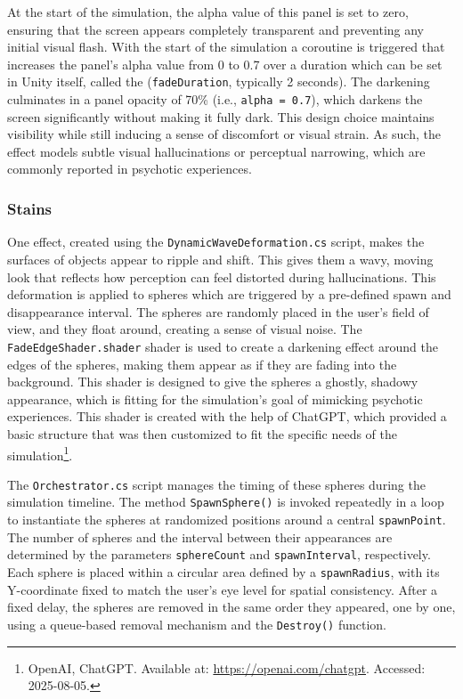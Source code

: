 At the start of the simulation, the alpha value of this panel is set to zero, ensuring that the screen appears completely transparent and preventing any initial visual flash. With the start of the simulation a coroutine is triggered that increases the panel’s alpha value from 0 to 0.7 over a duration which can be set in Unity itself, called the (\texttt{fadeDuration}, typically 2 seconds). The darkening culminates in a panel opacity of 70\% (i.e., \texttt{alpha = 0.7}), which darkens the screen significantly without making it fully dark. This design choice maintains visibility while still inducing a sense of discomfort or visual strain. As such, the effect models subtle visual hallucinations or perceptual narrowing, which are commonly reported in psychotic experiences. 

\subsubsection{Stains}
One effect, created using the \texttt{DynamicWaveDeformation.cs} script, makes the surfaces of objects appear to ripple and shift. This gives them a wavy, moving look that reflects how perception can feel distorted during hallucinations. This deformation is applied to spheres which are triggered by a pre-defined spawn and disappearance interval. The spheres are randomly placed in the user's field of view, and they float around, creating a sense of visual noise. The \texttt{FadeEdgeShader.shader} shader is used to create a darkening effect around the edges of the spheres, making them appear as if they are fading into the background. This shader is designed to give the spheres a ghostly, shadowy appearance, which is fitting for the simulation's goal of mimicking psychotic experiences. This shader is created with the help of ChatGPT, which provided a basic structure that was then customized to fit the specific needs of the simulation\footnote{OpenAI, ChatGPT. Available at: \url{https://openai.com/chatgpt}. Accessed: 2025-08-05.}.

\vspace{1em}

The \texttt{Orchestrator.cs} script manages the timing of these spheres during the simulation timeline. The method \texttt{SpawnSphere()} is invoked repeatedly in a loop to instantiate the spheres at randomized positions around a central \texttt{spawnPoint}. The number of spheres and the interval between their appearances are determined by the parameters \texttt{sphereCount} and \texttt{spawnInterval}, respectively. Each sphere is placed within a circular area defined by a \texttt{spawnRadius}, with its Y-coordinate fixed to match the user’s eye level for spatial consistency. After a fixed delay, the spheres are removed in the same order they appeared, one by one, using a queue-based removal mechanism and the \texttt{Destroy()} function. 

